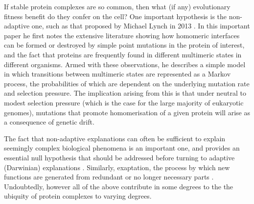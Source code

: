 \documentclass[a4paper,11pt,twoside,openright]{scrbook}
\begin{document}
If stable protein complexes are so common, then what (if any) evolutionary fitness benefit do they confer on the cell? One important hypothesis is the non-adaptive one, such as that proposed by Michael Lynch in 2013 \cite{Lynch2013}. In this important paper he first notes the extensive literature showing how homomeric interfaces can be formed or destroyed by simple point mutations in the protein of interest, and the fact that proteins are frequently found in different multimeric states in different organisms. Armed with these observations, he describes a simple model in which transitions between multimeric states are represented as a Markov process, the probabilities of which are dependent on the underlying mutation rate and selection pressure. The implication arising from this is that under neutral to modest selection pressure (which is the case for the large majority of eukaryotic genomes), mutations that promote homomerisation of a given protein will arise as a consequence of genetic drift.

The fact that non-adaptive explanations can often be sufficient to explain seemingly complex biological phenomena is an important one, and provides an essential null hypothesis that should be addressed before turning to adaptive (Darwinian) explanations \cite{Koonin2016}. Similarly, exaptation, the process by which new functions are generated from redundant or no longer necessary parts \cite{Gould1979}. Undoubtedly, however all of the above contribute in some degrees to the the ubiquity of protein complexes to varying degrees.
\end{document}
